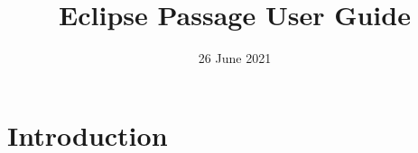 \documentclass[12pt]{article}
\title{Eclipse Passage User Guide}
\date{26 June 2021}
\begin{document}
    \section*{Introduction}
\end{document}
